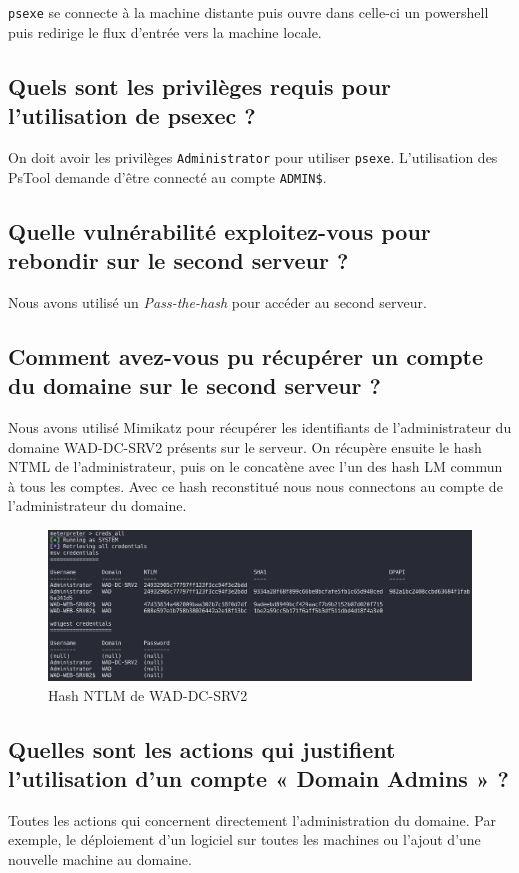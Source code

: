 \documentclass{extarticle} %
\begin{document}
    \texttt{psexe} se connecte à la machine distante puis ouvre dans celle-ci un powershell puis redirige le flux d'entrée
    vers la machine locale.

    \subsection{Quels sont les privilèges requis pour l’utilisation de psexec ?}
    On doit avoir les privilèges \texttt{Administrator} pour utiliser \texttt{psexe}. L'utilisation des PsTool demande d'être connecté
    au compte \texttt{ADMIN\$}.

    \subsection{Quelle vulnérabilité exploitez-vous pour rebondir sur le second serveur ?}
    Nous avons utilisé un \textit{Pass-the-hash} pour accéder au second serveur.

    \subsection{Comment avez-vous pu récupérer un compte du domaine sur le second serveur ?}
    Nous avons utilisé Mimikatz pour récupérer les identifiants de l'administrateur du domaine WAD-DC-SRV2 présents sur le serveur.
    On récupère ensuite le hash NTML de l'administrateur, puis on le concatène avec l'un des hash LM commun à tous les comptes.
    Avec ce hash reconstitué nous nous connectons au compte de l'administrateur du domaine.

    \begin{figure}[H]
        \centering
        \includegraphics[scale=0.25]{images/creds-dc-srv.png}
        \caption{Hash NTLM de WAD-DC-SRV2}
    \end{figure}

    \subsection{Quelles sont les actions qui justifient l’utilisation d’un compte « Domain Admins » ?}
    Toutes les actions qui concernent directement l'administration du domaine. Par exemple, le déploiement d'un logiciel sur
    toutes les machines ou l'ajout d'une nouvelle machine au domaine.
\end{document}
